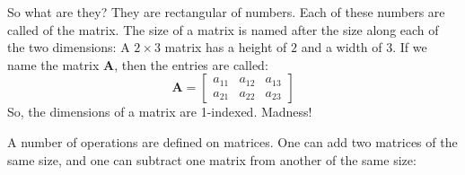 So what are they? They are rectangular  of numbers. Each of these numbers are called  of the matrix. The size of a matrix is named after the size along each of the two dimensions: A $2 \times 3$ matrix has a height of $2$ and a width of $3$. If we name the matrix $\mathbf{A}$, then the entries are called:
\begin{equation*}
  \mathbf{A} =
  \left[
    \begin{matrix}
      a_{11} & a_{12} & a_{13} \\
      a_{21} & a_{22} & a_{23}
    \end{matrix}
  \right]
\end{equation*}
So, the dimensions of a matrix are 1-indexed. Madness!

A number of operations are defined on matrices. One can add two matrices of the same size, and one can subtract one matrix from another of the same size:

